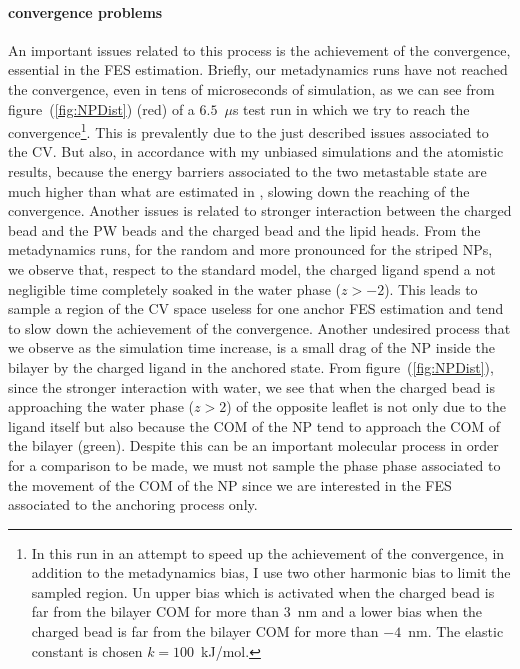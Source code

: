 \paragraph{\textbf{convergence problems}} An important issues related to this process is the achievement of the convergence, essential in the \ac{FES} estimation. Briefly, our metadynamics runs have not reached the convergence, even in tens of microseconds of simulation, as we can see from figure~(\ref{fig:NPDist}) (red) of a $6.5$~$\mu$s test run in which we try to reach the convergence\footnote{In this run in an attempt to speed up the achievement of the convergence, in addition to the metadynamics bias, I use two other harmonic bias to limit the sampled region. Un upper bias which is activated when the charged bead is far from the bilayer \acs{COM} for more than $3$~nm and a lower bias when the charged bead is far from the bilayer \acs{COM} for more than $-4$~nm. The elastic constant is chosen $k = 100$~kJ/mol.}. This is prevalently due to the just described issues associated to the \ac{CV}. But also, in accordance with my unbiased simulations and the atomistic results, because the energy barriers associated to the two metastable state are much higher than what are estimated in \cite{ourPaper}, slowing down the reaching of the convergence. Another issues is related to stronger interaction between the charged bead and the \ac{PW} beads and the charged bead and the lipid heads. From the metadynamics runs, for the random and more pronounced for the striped \acp{NP}, we observe that, respect to the standard \martini model, the charged ligand spend a not negligible time completely soaked in the water phase ($z>-2$). This leads to sample a region of the \ac{CV} space useless for one anchor \ac{FES} estimation and tend to slow down the achievement of the convergence. Another undesired process that we observe as the simulation time increase, is a small drag of the \ac{NP} inside the bilayer by the charged ligand in the anchored state. From figure~(\ref{fig:NPDist}), since the stronger interaction with water, we see that when the charged bead is approaching the water phase ($z>2$) of the opposite leaflet is not only due to the ligand itself but also because the \ac{COM} of the \ac{NP} tend to approach the \ac{COM} of the bilayer (green). Despite this can be an important molecular process in order for a comparison to be made, we must not sample the phase phase associated to the movement of the \ac{COM} of the \ac{NP} since we are interested in the \ac{FES} associated to the anchoring process only.

